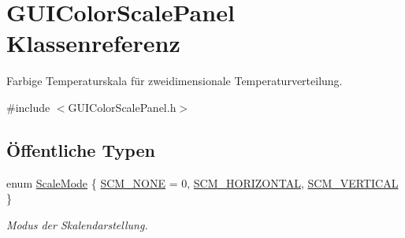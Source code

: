 \hypertarget{classGUIColorScalePanel}{\section{G\-U\-I\-Color\-Scale\-Panel Klassenreferenz}
\label{classGUIColorScalePanel}
}


Farbige Temperaturskala für zweidimensionale Temperaturverteilung.  




{\ttfamily \#include $<$G\-U\-I\-Color\-Scale\-Panel.\-h$>$}

\subsection*{Öffentliche Typen}
\begin{DoxyCompactItemize}
\item 
enum \hyperlink{classGUIColorScalePanel_a56a63e898188b90b82295ff7c3ebc265}{Scale\-Mode} \{ \hyperlink{classGUIColorScalePanel_a56a63e898188b90b82295ff7c3ebc265a341cbf92114357f8101219493b2e8b37}{S\-C\-M\-\_\-\-N\-O\-N\-E} = 0, 
\hyperlink{classGUIColorScalePanel_a56a63e898188b90b82295ff7c3ebc265a2a91733dc30cc826d816f7f558f3781e}{S\-C\-M\-\_\-\-H\-O\-R\-I\-Z\-O\-N\-T\-A\-L}, 
\hyperlink{classGUIColorScalePanel_a56a63e898188b90b82295ff7c3ebc265aa3e90f467c8f641f72ee863bc29a4032}{S\-C\-M\-\_\-\-V\-E\-R\-T\-I\-C\-A\-L}
 \}
\begin{DoxyCompactList}\small\item\em Modus der Skalendarstellung. \end{DoxyCompactList}\end{DoxyCompactItemize}
